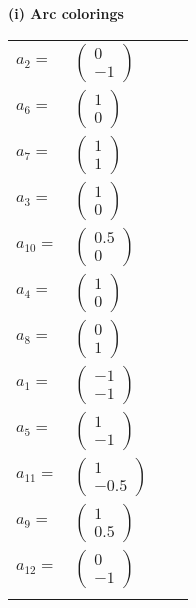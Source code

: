 \documentclass[1p]{elsarticle_modified}
\theoremstyle{definition}
\begin{document}
\flushleft \textbf{(i) Arc colorings}\\
\begin{tabular}{m{7pt} m{180pt} m{7pt} m{180pt} }
\flushright $a_{2}=$&$\begin{pmatrix}0\\-1\end{pmatrix}$ \\
\flushright $a_{6}=$&$\begin{pmatrix}1\\0\end{pmatrix}$ \\
\flushright $a_{7}=$&$\begin{pmatrix}1\\1\end{pmatrix}$ \\
\flushright $a_{3}=$&$\begin{pmatrix}1\\0\end{pmatrix}$ \\
\flushright $a_{10}=$&$\begin{pmatrix}0.5\\0\end{pmatrix}$ \\
\flushright $a_{4}=$&$\begin{pmatrix}1\\0\end{pmatrix}$ \\
\flushright $a_{8}=$&$\begin{pmatrix}0\\1\end{pmatrix}$ \\
\flushright $a_{1}=$&$\begin{pmatrix}-1\\-1\end{pmatrix}$ \\
\flushright $a_{5}=$&$\begin{pmatrix}1\\-1\end{pmatrix}$ \\
\flushright $a_{11}=$&$\begin{pmatrix}1\\-0.5\end{pmatrix}$ \\
\flushright $a_{9}=$&$\begin{pmatrix}1\\0.5\end{pmatrix}$ \\
\flushright $a_{12}=$&$\begin{pmatrix}0\\-1\end{pmatrix}$\\&\end{tabular}
\end{document}
